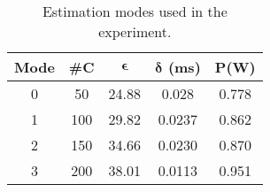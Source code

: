 \begin{table}[htb]
\begin{center}
\caption{Estimation modes used in the experiment.}
\label{tbl:modes_exp}
\begin{tabular} {|c|c|c|c|c|}
	\hline
	\textbf{Mode} & \textbf{\#C} & $\pmb{\epsilon}$ & $\pmb{\delta}$ \textbf{(ms)} & $\pmb{P}$\textbf{(W)} \\ \hline
	0 & 50 &  24.88 & 0.028 &  0.778  \\ \hline
 	1 & 100 & 29.82 & 0.0237 &  0.862  \\ \hline
	2 & 150 & 34.66 & 0.0230 & 0.870 \\ \hline
	3 & 200 & 38.01 & 0.0113 & 0.951 \\ \hline
	\end{tabular}	
	\end{center}
\end{table}



